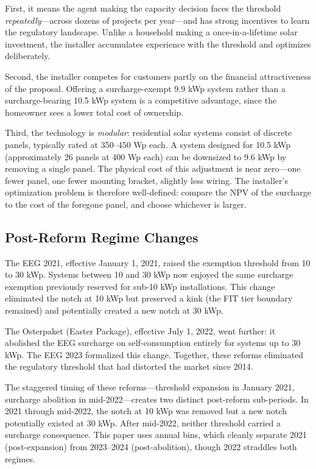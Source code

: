 \documentclass[12pt]{article}
\begin{document}
First, it means the agent making the capacity decision faces the threshold \textit{repeatedly}---across dozens of projects per year---and has strong incentives to learn the regulatory landscape. Unlike a household making a once-in-a-lifetime solar investment, the installer accumulates experience with the threshold and optimizes deliberately.

Second, the installer competes for customers partly on the financial attractiveness of the proposal. Offering a surcharge-exempt 9.9 kWp system rather than a surcharge-bearing 10.5 kWp system is a competitive advantage, since the homeowner sees a lower total cost of ownership.

Third, the technology is \textit{modular}: residential solar systems consist of discrete panels, typically rated at 350--450 Wp each. A system designed for 10.5 kWp (approximately 26 panels at 400 Wp each) can be downsized to 9.6 kWp by removing a single panel. The physical cost of this adjustment is near zero---one fewer panel, one fewer mounting bracket, slightly less wiring. The installer's optimization problem is therefore well-defined: compare the NPV of the surcharge to the cost of the foregone panel, and choose whichever is larger.

\subsection{Post-Reform Regime Changes}

The EEG 2021, effective January 1, 2021, raised the exemption threshold from 10 to 30 kWp. Systems between 10 and 30 kWp now enjoyed the same surcharge exemption previously reserved for sub-10 kWp installations. This change eliminated the notch at 10 kWp but preserved a kink (the FIT tier boundary remained) and potentially created a new notch at 30 kWp.

The Osterpaket (Easter Package), effective July 1, 2022, went further: it abolished the EEG surcharge on self-consumption entirely for systems up to 30 kWp. The EEG 2023 formalized this change. Together, these reforms eliminated the regulatory threshold that had distorted the market since 2014.

The staggered timing of these reforms---threshold expansion in January 2021, surcharge abolition in mid-2022---creates two distinct post-reform sub-periods. In 2021 through mid-2022, the notch at 10 kWp was removed but a new notch potentially existed at 30 kWp. After mid-2022, neither threshold carried a surcharge consequence. This paper uses annual bins, which cleanly separate 2021 (post-expansion) from 2023--2024 (post-abolition), though 2022 straddles both regimes.
\end{document}
